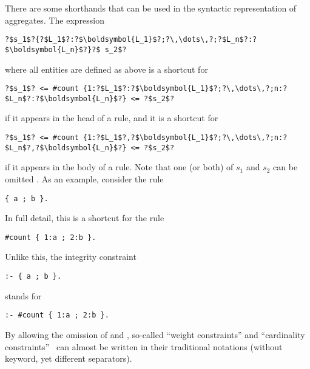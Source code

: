 There are some shorthands that can be used in the syntactic representation of aggregates.
%
The expression
%
\begin{lstlisting}[numbers=none,escapechar=?]
?$s_1$?{?$L_1$?:?$\boldsymbol{L_1}$?;?\,\dots\,?;?$L_n$?:?$\boldsymbol{L_n}$?}?$ s_2$?
\end{lstlisting}
%
where all entities are defined as above 
is a shortcut for
%
\begin{lstlisting}[numbers=none,escapechar=?]
?$s_1$? <= #count {1:?$L_1$?:?$\boldsymbol{L_1}$?;?\,\dots\,?;n:?$L_n$?:?$\boldsymbol{L_n}$?} <= ?$s_2$?
\end{lstlisting}
%
if it appears in the head of a rule, and
it is a shortcut for
%
\begin{lstlisting}[numbers=none,escapechar=?]
?$s_1$? <= #count {1:?$L_1$?,?$\boldsymbol{L_1}$?;?\,\dots\,?;n:?$L_n$?,?$\boldsymbol{L_n}$?} <= ?$s_2$?
\end{lstlisting}
%
if it appears in the body of a rule.
%
Note that one (or both) of $s_1$ and $s_2$ can be omitted .
%
As an example,
consider the rule
\begin{lstlisting}[numbers=none]
{ a ; b }.
\end{lstlisting}
In full detail, this is a shortcut for the rule
\begin{lstlisting}[numbers=none]
#count { 1:a ; 2:b }.
\end{lstlisting}
Unlike this,
the integrity constraint
\begin{lstlisting}[numbers=none]
:- { a ; b }.
\end{lstlisting}
stands for
\begin{lstlisting}[numbers=none]
:- #count { 1:a ; 2:b }.
\end{lstlisting}
By allowing the omission of  and ,
so-called 
``weight constraints'' and ``cardinality constraints''~\cite{siniso02a,lparseManual}
can almost be written in their traditional notations (without keyword, yet different separators).



